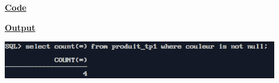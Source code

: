 \newpage
{}

\textbf{\underline{Code}}


\vspace{1cm}
\textbf{\underline{Output}}
\vspace{1cm}
\begin{center}
    \includegraphics[width=0.9\textwidth]{Questions/q26/q26.png}
\end{center}


